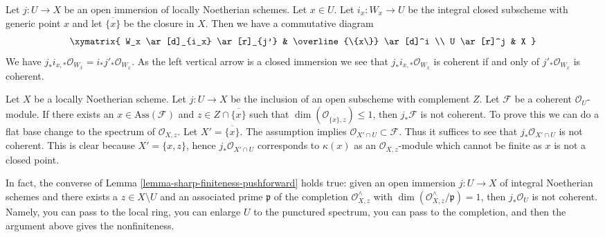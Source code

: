 \begin{remark}
\label{remark-closure}
Let $j : U \to X$ be an open immersion of locally Noetherian schemes.
Let $x \in U$. Let $i_x : W_x \to U$ be the integral closed subscheme
with generic point $x$ and let $\overline{\{x\}}$ be the closure in $X$.
Then we have a commutative diagram
$$
\xymatrix{
W_x \ar[d]_{i_x} \ar[r]_{j'} & \overline{\{x\}} \ar[d]^i \\
U \ar[r]^j & X
}
$$
We have $j_*i_{x, *}\mathcal{O}_{W_x} = i_*j'_*\mathcal{O}_{W_x}$.
As the left vertical arrow is a closed immersion we see that
$j_*i_{x, *}\mathcal{O}_{W_x}$ is coherent if and only of
$j'_*\mathcal{O}_{W_x}$ is coherent.
\end{remark}

\begin{remark}
\label{remark-no-finiteness-pushforward}
Let $X$ be a locally Noetherian scheme. Let $j : U \to X$ be the inclusion of
an open subscheme with complement $Z$. Let $\mathcal{F}$ be a coherent
$\mathcal{O}_U$-module. If there exists an $x \in \text{Ass}(\mathcal{F})$ and
$z \in Z \cap \overline{\{x\}}$ such that
$\dim(\mathcal{O}_{\overline{\{x\}}, z}) \leq 1$, then $j_*\mathcal{F}$ is not
coherent. To prove this we can do a flat base change to the spectrum
of $\mathcal{O}_{X, z}$. Let $X' = \overline{\{x\}}$.
The assumption implies $\mathcal{O}_{X' \cap U} \subset \mathcal{F}$.
Thus it suffices to see that $j_*\mathcal{O}_{X' \cap U}$ is not
coherent. This is clear because $X' = \{x, z\}$, hence
$j_*\mathcal{O}_{X' \cap U}$ corresponds to $\kappa(x)$ as an
$\mathcal{O}_{X, z}$-module which cannot be finite as $x$ is not
a closed point.

\medskip\noindent
In fact, the converse of Lemma \ref{lemma-sharp-finiteness-pushforward}
holds true: given an open immersion $j : U \to X$ of integral Noetherian
schemes and there exists a $z \in X \setminus U$ and an associated prime
$\mathfrak p$ of the completion $\mathcal{O}_{X, z}^\wedge$
with $\dim(\mathcal{O}_{X, z}^\wedge/\mathfrak p) = 1$,
then $j_*\mathcal{O}_U$ is not coherent. Namely, you can pass to
the local ring, you can enlarge $U$ to the punctured spectrum,
you can pass to the completion, and then the argument above gives
the nonfiniteness.
\end{remark}

